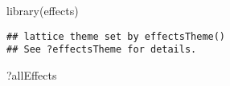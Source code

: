 \documentclass[
]{article}
\newenvironment{Shaded}{\begin{snugshade}}{\end{snugshade}}
\newcommand{\FunctionTok}[1]{\textcolor[rgb]{0.00,0.00,0.00}{#1}}
\newcommand{\NormalTok}[1]{#1}
\begin{document}
\begin{Shaded}
\begin{Highlighting}[]
\FunctionTok{library}\NormalTok{(effects)}
\end{Highlighting}
\end{Shaded}

\begin{verbatim}
## lattice theme set by effectsTheme()
## See ?effectsTheme for details.
\end{verbatim}

\begin{Shaded}
\begin{Highlighting}[]
\NormalTok{?allEffects}
\end{Highlighting}
\end{Shaded}
\end{document}
